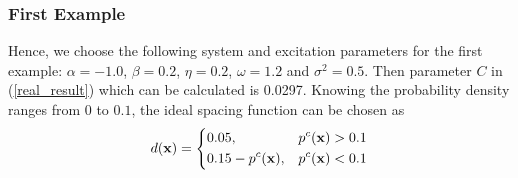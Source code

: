 \documentclass[a4paper, 11pt, final]{article}
\begin{document}
\subsubsection{First Example}
Hence, we choose the following system and
excitation parameters for the first example: $\alpha=-1.0$, $\beta=0.2$, $\eta=0.2$,
$\omega=1.2$ and $\sigma^2=0.5$. Then parameter $C$ in (\ref{real_result}) which can be calculated
is 0.0297. Knowing the probability density ranges from $0$ to $0.1$,
the ideal spacing function can be chosen as
\[d({\bf x}) = \left\{ \begin{aligned}
    &0.05,                & p^c({\bf x}) > 0.1 \\
    &0.15 - p^c({\bf x}), & p^c({\bf x}) < 0.1 \\
\end{aligned} \right.\]
\end{document}
